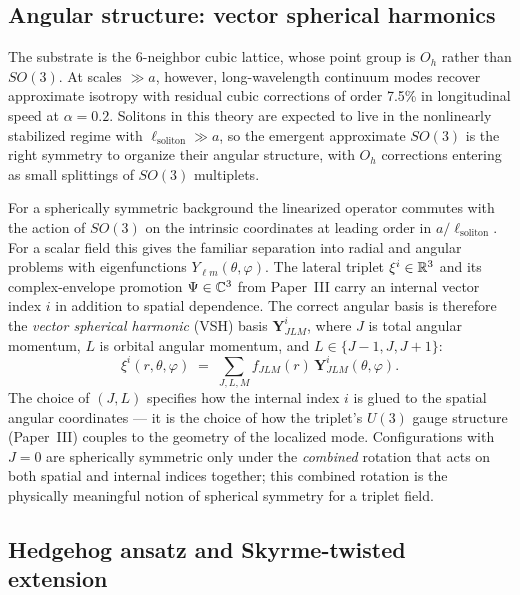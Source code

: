 \subsection{Angular structure: vector spherical harmonics}
\label{subsec:vsh}

The substrate is the 6-neighbor cubic lattice, whose point group is $O_h$ rather than $SO(3)$.
At scales $\gg a$, however, long-wavelength continuum modes recover approximate isotropy with
residual cubic corrections of order 7.5\% in longitudinal speed at $\alpha=0.2$.
Solitons in this theory are expected to live in the nonlinearly stabilized regime with
$\ell_{\mathrm{soliton}}\gg a$, so the emergent approximate $SO(3)$ is the right symmetry to
organize their angular structure, with $O_h$ corrections entering as small splittings of $SO(3)$
multiplets.

For a spherically symmetric background the linearized operator commutes with the action of $SO(3)$
on the intrinsic coordinates at leading order in $a/\ell_{\mathrm{soliton}}$.
For a scalar field this gives the familiar separation into radial and angular problems with
eigenfunctions $Y_{\ell m}(\theta,\varphi)$.
The lateral triplet $\xi^i\in\mathbb{R}^3$ and its complex-envelope promotion $\Psi\in\mathbb{C}^3$ from
Paper~III carry an internal vector index $i$ in addition to spatial dependence.
The correct angular basis is therefore the \emph{vector spherical harmonic} (VSH) basis
$\mathbf{Y}^i_{JLM}$, where $J$ is total angular momentum, $L$ is orbital angular momentum,
and $L\in\{J-1,J,J+1\}$:
\begin{equation}
  \xi^i(r,\theta,\varphi)
  \;=\; \sum_{J,L,M} f_{JLM}(r)\,\mathbf{Y}^i_{JLM}(\theta,\varphi).
  \label{eq:vsh-decomposition}
\end{equation}
The choice of $(J,L)$ specifies how the internal index $i$ is glued to the spatial angular
coordinates --- it is the choice of how the triplet's $U(3)$ gauge structure (Paper~III) couples to
the geometry of the localized mode.
Configurations with $J=0$ are spherically symmetric only under the \emph{combined} rotation that
acts on both spatial and internal indices together; this combined rotation is the physically
meaningful notion of spherical symmetry for a triplet field.

\subsection{Hedgehog ansatz and Skyrme-twisted extension}
\label{subsec:hedgehog}

